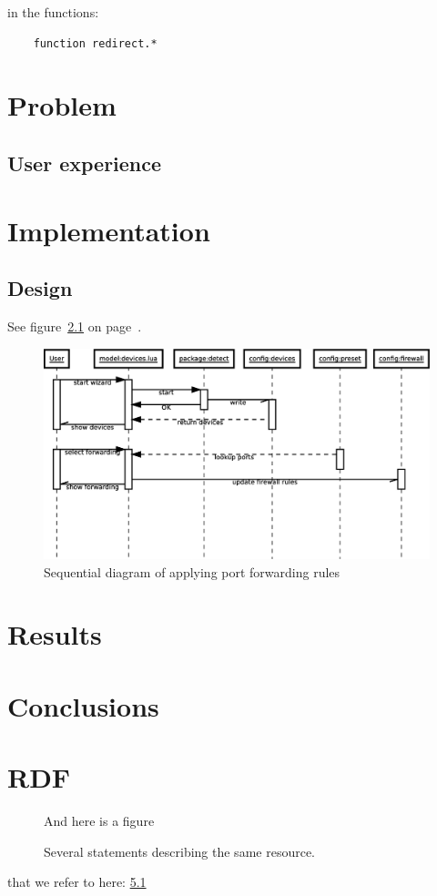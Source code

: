 \documentclass[a4paper,11pt]{kth-mag}
\begin{document}
in the functions:

\begin{verbatim}
    function redirect.*
\end{verbatim}

\chapter{Problem}
\section{User experience}

\chapter{Implementation}
\section{Design}
See figure~\ref{fig:wizard-seq_dia} on page~\pageref{fig:wizard-seq_dia}.
\begin{figure}[h!]
   \centering
   \includegraphics[width=15cm]{wizard-seq_dia}
   \caption{Sequential diagram of applying port forwarding rules}
   \label{fig:wizard-seq_dia}
\end{figure}

\chapter{Results}

\chapter{Conclusions}
\appendix
\addappheadtotoc

\chapter{RDF}\label{appA}
\begin{figure}[ht]
   \begin{center}
And here is a figure
      \caption{
         \small{
            Several statements describing the same resource.
         }
      }
      \label{RDF_4}
   \end{center}
\end{figure}

that we refer to here: \ref{RDF_4}



\end{document}
